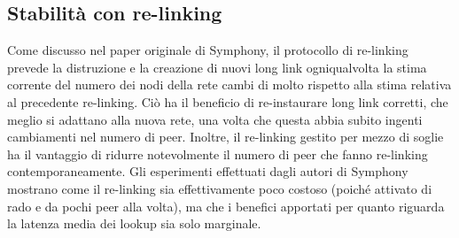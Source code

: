 \documentclass[prodmode,acmtap]{acmlarge}
\begin{document}
\subsection{Stabilità con re-linking}
Come discusso nel paper originale di Symphony, il protocollo di re-linking prevede la distruzione e la creazione di nuovi long link ogniqualvolta la stima corrente del numero dei nodi della rete cambi di molto rispetto alla stima relativa al precedente re-linking. Ciò ha il beneficio di re-instaurare long link corretti, che meglio si adattano alla nuova rete, una volta che questa abbia subito ingenti cambiamenti nel numero di peer. Inoltre, il re-linking gestito per mezzo di soglie ha il vantaggio di ridurre notevolmente il numero di peer che fanno re-linking contemporaneamente. Gli esperimenti effettuati dagli autori di Symphony mostrano come il re-linking sia effettivamente poco costoso (poiché attivato di rado e da pochi peer alla volta), ma che i benefici apportati per quanto riguarda la latenza media dei lookup sia solo marginale.
\end{document}
